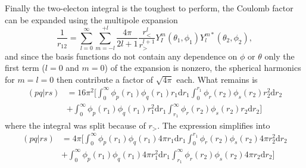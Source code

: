 \documentclass[final,3p,times,twocolumn]{elsarticle}
\begin{document}
	Finally the two-electon integral is the toughest to perform, the Coulomb factor can be expanded using the multipole expansion
	\begin{equation}
		\frac{1}{r_{12}}=\sum_{l=0}^{\infty} \sum_{m=-l}^{+l} \frac{4 \pi}{2 l+1} \frac{r_{<}^{l}}{r_{>}^{l+1}} Y_{I}^{m}\left(\theta_{1}, \phi_{1}\right) Y_{l}^{m *}\left(\theta_{2}, \phi_{2}\right),
	\end{equation}
	and since the basis functions do not contain any dependence on $\phi$ or $\theta$ only the first term ($l=0$ and $m=0$) of the expansion is nonzero, the spherical harmonics for $m=l=0$ then contribute a factor of $\sqrt{4\pi}$ each. What remains is 
	\begin{equation}
		\begin{aligned}
			(pq|rs) &= 16\pi^2\bigg[
			\int_{0}^{\infty} \phi_{p}(r_1)\phi_{q}(r_1)r_1\mathrm{d}r_1
			\int_{0}^{r_1}\phi_{r}(r_2)\phi_{s}(r_2)r^2_2\mathrm{d}r_2\\
			&+
			\int_{0}^{\infty} \phi_{p}(r_1)\phi_{q}(r_1)r^2_1\mathrm{d}r_1
			\int_{r_1}^{\infty} \phi_{r}(r_2)\phi_{s}(r_2)r_2\mathrm{d}r_2
			\bigg]
		\end{aligned}
	\end{equation}
	where the integral was split because of $r_>$. The expression simplifies into
	\begin{equation}
		\begin{aligned}
			(pq|rs) &= 4\pi\bigg[
			\int_{0}^{\infty} \phi_{p}(r_1)\phi_{q}(r_1)4\pi r_1\mathrm{d}r_1
			\int_{0}^{r_1}\phi_{r}(r_2)\phi_{s}(r_2)4\pi r^2_2\mathrm{d}r_2\\
			&+
			\int_{0}^{\infty} \phi_{p}(r_1)\phi_{q}(r_1)4\pi r^2_1\mathrm{d}r_1
			\int_{r_1}^{\infty} \phi_{r}(r_2)\phi_{s}(r_2)4\pi r_2\mathrm{d}r_2
			\bigg]
		\end{aligned}
	\end{equation}	
	
	
	
	
	
	
	
	
\end{document}
